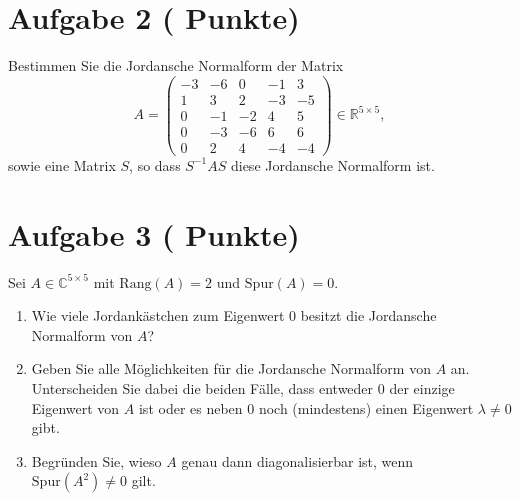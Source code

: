 \documentclass[11pt, a4paper]{article}
\newcommand{\aufgabe}[2]{%
  \section*{\Large\bfseries Aufgabe #1%
  \if\relax\detokenize{#2}\relax\else \hfill\normalfont\normalsize(#2 Punkte)\fi}%
  \vspace{-1.5ex}
}
\begin{document}
\aufgabe{2}{}
Bestimmen Sie die Jordansche Normalform der Matrix
\[
A=
\begin{pmatrix}
-3 & -6 & 0 & -1 & 3\\
 1 &  3 & 2 & -3 & -5\\
 0 & -1 & -2 &  4 & 5\\
 0 & -3 & -6 &  6 & 6\\
 0 &  2 & 4 & -4 & -4
\end{pmatrix}\in\mathbb{R}^{5\times 5},
\]
sowie eine Matrix $S$, so dass $S^{-1}AS$ diese Jordansche Normalform ist.
\begin{framed}\end{framed}

\aufgabe{3}{}
Sei $A\in\mathbb{C}^{5\times 5}$ mit $\mathrm{Rang}(A)=2$ und $\mathrm{Spur}(A)=0$.
\begin{enumerate}
  \item Wie viele Jordankästchen zum Eigenwert $0$ besitzt die Jordansche Normalform von $A$?
  \begin{framed}\end{framed}

  \item Geben Sie alle Möglichkeiten für die Jordansche Normalform von $A$ an. Unterscheiden Sie dabei die beiden Fälle, dass entweder $0$ der einzige Eigenwert von $A$ ist oder es neben $0$ noch (mindestens) einen Eigenwert $\lambda\neq 0$ gibt.
  \begin{framed}\end{framed}

  \item Begründen Sie, wieso $A$ genau dann diagonalisierbar ist, wenn $\mathrm{Spur}(A^2)\neq 0$ gilt.
  \begin{framed}\end{framed}
\end{enumerate}
\end{document}
